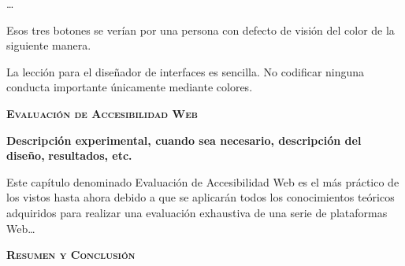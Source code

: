 \documentclass[a4paper]{article}
\begin{document}
{
…}

{%
 \par}

{
Esos tres botones se verían por una persona con defecto de visión del color de la siguiente manera.}

{%
 \par}

{
La lección para el diseñador de interfaces es sencilla. No codificar ninguna conducta importante únicamente mediante colores.}


\bigskip


\bigskip

\clearpage\setcounter{page}{1}\pagestyle{Convertirviii}
{\raggedleft\bfseries\scshape
Evaluación de Accesibilidad Web
\par}

\clearpage
\bigskip

\clearpage\setcounter{page}{1}\pagestyle{Convertirix}

\bigskip


\bigskip


\bigskip


\bigskip

{
{\textbf{Descripción experimental, cuando sea necesario, descripción del diseño,}}{\textbf{ resultados, etc.}}}


\bigskip

{
{Este capítulo denominado Evaluación de Accesibilidad }{Web es el más práctico de los vistos hasta ahora debido a que se aplicarán todos los conocimientos teóricos adquiridos para realizar una evaluación exhaustiva de una serie de plataformas Web…}}


\bigskip

\clearpage\setcounter{page}{1}\pagestyle{Convertirx}
{\raggedleft\bfseries\scshape
{Resumen y }{Conclusión}{ }
\par}

\clearpage
\bigskip

\clearpage\setcounter{page}{1}\pagestyle{Convertirxi}
\end{document}

